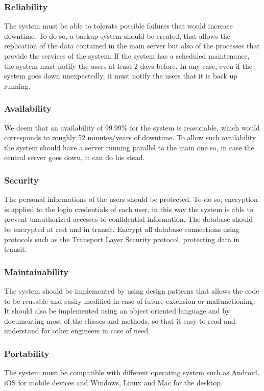 \documentclass[a4paper, 11pt, titlepage]{article}
\begin{document}
\subsubsection{Reliability}
The system must be able to tolerate possible failures that would increase downtime. To do so,
a backup system should be created, that allows the replication of the data contained in the
main server but also of the processes that provide the services of the system. If the system has
a scheduled maintenance, the system must notify the users at least 2 days before. In any case,
even if the system goes down unexpectedly, it must notify the users that it is back up running.

\subsubsection{Availability}
We deem that an availability of 99.99\% for the system is reasonable, which would corresponds to roughly 52 minutes/years of downtime.
To allow such availability the system should have a server running parallel to the main one so,
in case the central server goes down, it can do his stead.

\subsubsection{Security}
The personal informations of the users should be protected.
To do so, encryption is applied to the login credentials of each user, in this way the system
is able to prevent unauthorized accesses to confidential information. The database should be
encrypted at rest and in transit. Encrypt all database connections using protocols such as the
Transport Layer Security protocol, protecting data in transit.

\subsubsection{Maintainability}
The system should be implemented by using design patterns that allows the code to be reusable
and easily modified in case of future extension or malfunctioning. It should also be implemented
using an object oriented language and by documenting most of the classes and methods, so
that it easy to read and understand for other engineers in case of need.

\subsubsection{Portability}
The system must be compatible with different operating system such as Android, iOS for mobile
devices and Windows, Linux and Mac for the desktop.
\end{document}
